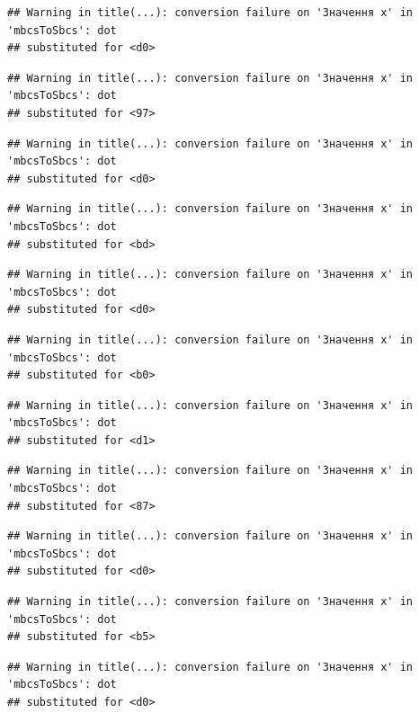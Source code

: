 \documentclass[
  11pt,
]{book}
\begin{document}
\begin{verbatim}
## Warning in title(...): conversion failure on 'Значення x' in 'mbcsToSbcs': dot
## substituted for <d0>
\end{verbatim}

\begin{verbatim}
## Warning in title(...): conversion failure on 'Значення x' in 'mbcsToSbcs': dot
## substituted for <97>
\end{verbatim}

\begin{verbatim}
## Warning in title(...): conversion failure on 'Значення x' in 'mbcsToSbcs': dot
## substituted for <d0>
\end{verbatim}

\begin{verbatim}
## Warning in title(...): conversion failure on 'Значення x' in 'mbcsToSbcs': dot
## substituted for <bd>
\end{verbatim}

\begin{verbatim}
## Warning in title(...): conversion failure on 'Значення x' in 'mbcsToSbcs': dot
## substituted for <d0>
\end{verbatim}

\begin{verbatim}
## Warning in title(...): conversion failure on 'Значення x' in 'mbcsToSbcs': dot
## substituted for <b0>
\end{verbatim}

\begin{verbatim}
## Warning in title(...): conversion failure on 'Значення x' in 'mbcsToSbcs': dot
## substituted for <d1>
\end{verbatim}

\begin{verbatim}
## Warning in title(...): conversion failure on 'Значення x' in 'mbcsToSbcs': dot
## substituted for <87>
\end{verbatim}

\begin{verbatim}
## Warning in title(...): conversion failure on 'Значення x' in 'mbcsToSbcs': dot
## substituted for <d0>
\end{verbatim}

\begin{verbatim}
## Warning in title(...): conversion failure on 'Значення x' in 'mbcsToSbcs': dot
## substituted for <b5>
\end{verbatim}

\begin{verbatim}
## Warning in title(...): conversion failure on 'Значення x' in 'mbcsToSbcs': dot
## substituted for <d0>
\end{verbatim}
\end{document}
